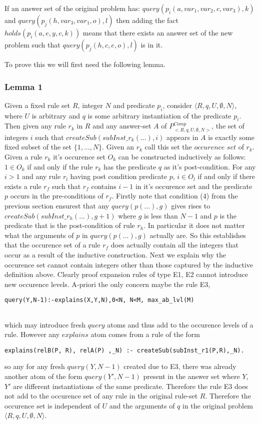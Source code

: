 \documentclass[sigconf]{acmart}
\begin{document}
If an answer set of the original problem has:
$query(p_{i}(a,var_{1},var_{2},c,var_{3}),k)$ and $query(p_{j}(h,var_{3},var_{1},o),l)$ then adding the fact $holds(p_{i}(a,e,y,c,k))$ means that there exists an answer set of the new problem such that $query(p_{j}(h,c,e,o),l)$ is in it. 

To prove this we will first need the following lemma.

\subsubsection{Lemma 1}
Given a fixed rule set $R$, integer $N$ and predicate $p_{i}$, consider $\langle R,q,U,\emptyset,N\rangle$, where $U$ is arbitrary and $q$ is some arbitrary instantiation of the predicate $p_{i}$. Then given any rule $r_{k}$ in $R$ and any answer-set $A$ of $P_{<R,q,U,\emptyset,N>}^{Comp}$, the set of integers $i$ such that $createSub(subInst\_r_{k}(...),i)$ appears in $A$ is exactly some fixed subset of the set $\{1,...,N\}$. Given an $r_{k}$ call this set the $\textit{occurence set}$ of $r_{k}$. Given a rule $r_{k}$ it's occurence set $O_{k}$ can be constructed inductively as follows:\\
$1 \in O_{k}$ if and only if the rule $r_{k}$ has the predicate $q$ as it's
post-condition. For any $i>1$ and any rule $r_{l}$ having post condition
predicate $p$, $i\in O_{l}$ if and only if there exists a rule $r_{f}$ such
that $r_{f}$ contains $i-1$ in it's occurence set and the predicate $p$ occurs
in the pre-conditions of $r_{f}$. Firstly note that condition (4) from the
previous section ensurest that any $query(p(...),g)$ gives rises to
$createSub(subInst\_r_{h}(...),g+1)$ where $g$ is less than $N-1$ and $p$ is
the predicate that is the post-condition of rule $r_{h}$. In particular it
does not matter what the arguments of $p$ in $query(p(...),g)$ actually
are. So this establishes that the occurence set of a rule $r_{f}$ does
actually contain all the integers that occur as a result of the inductive
construction. Next we explain why the occurence set cannot contain integers
other than those captured by the inductive definition above. Clearly proof
expansion rules of type E1, E2 cannot introduce new occurence levels. A-priori
the only concern maybe the rule E3,
\begin{verbatim}
query(Y,N-1):-explains(X,Y,N),0<N, N<M, max_ab_lvl(M)
    
\end{verbatim} 
which may introduce fresh $query$ atoms and thus add to the occurence levels of a rule. However any $explains$ atom comes from a rule of the form 
\begin{verbatim}
explains(relB(P, R), relA(P) ,_N) :- createSub(subInst_r1(P,R),_N).
\end{verbatim} 
so any for any fresh $query(Y,N-1)$ created due to E3, there was already another atom of the form $query(Y',N-1)$ present in the answer set where $Y$, $Y'$ are different instantiations of the same predicate. Therefore the rule E3 does not add to the occurence set of any rule in the original rule-set $R$. Therefore the occurence set is independent of $U$ and the arguments of $q$ in the original problem $\langle R,q,U,\emptyset,N\rangle$.
\end{document}
